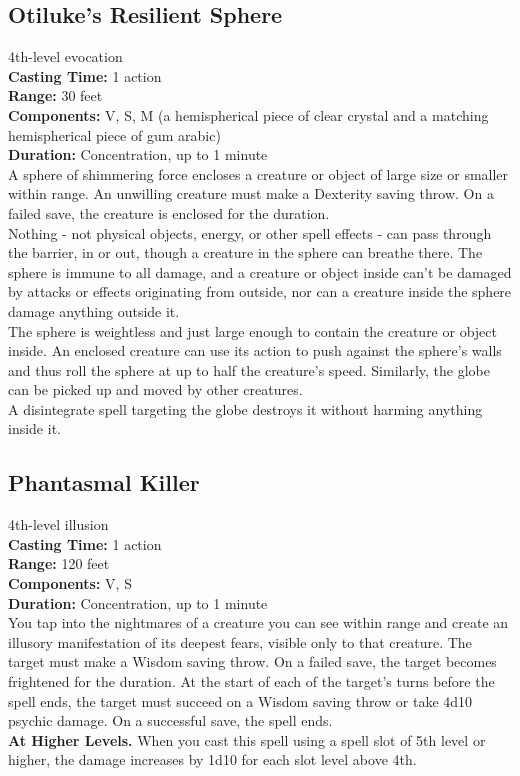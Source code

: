 \documentclass[11pt, A4paper, english]{article}
\begin{document}
		\subsection{Otiluke's Resilient Sphere}
4th-level evocation \\
\textbf{Casting Time:} 1 action \\
\textbf{Range:} 30 feet \\
\textbf{Components:} V, S, M (a hemispherical piece of clear crystal and a matching hemispherical piece of gum arabic) \\
\textbf{Duration:} Concentration, up to 1 minute \\
A sphere of shimmering force encloses a creature or object of large size or smaller within range. An unwilling creature must make a Dexterity saving throw. On a failed save, the creature is enclosed for the duration. \\
Nothing - not physical objects, energy, or other spell effects - can pass through the barrier, in or out, though a creature in the sphere can breathe there. The sphere is immune to all damage, and a creature or object inside can't be damaged by attacks or effects originating from outside, nor can a creature inside the sphere damage anything outside it. \\
The sphere is weightless and just large enough to contain the creature or object inside. An enclosed creature can use its action to push against the sphere's walls and thus roll the sphere at up to half the creature's speed. Similarly, the globe can be picked up and moved by other creatures. \\
A disintegrate spell targeting the globe destroys it without harming anything inside it.

		\subsection{Phantasmal Killer}
4th-level illusion \\
\textbf{Casting Time:} 1 action \\
\textbf{Range:} 120 feet \\
\textbf{Components:} V, S \\
\textbf{Duration:} Concentration, up to 1 minute \\
You tap into the nightmares of a creature you can see within range and create an illusory manifestation of its deepest fears, visible only to that creature. The target must make a Wisdom saving throw. On a failed save, the target becomes frightened for the duration. At the start of each of the target's turns before the spell ends, the target must succeed on a Wisdom saving throw or take 4d10 psychic damage. On a successful save, the spell ends. \\
\textbf{At Higher Levels.} When you cast this spell using a spell slot of 5th level or higher, the damage increases by 1d10 for each slot level above 4th.
\end{document}
